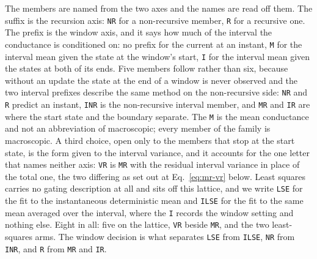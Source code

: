 The members are named from the two axes and the names are read off them. The suffix is the
recursion axis: \texttt{NR} for a non-recursive member, \texttt{R} for a recursive one. The
prefix is the window axis, and it says how much of the interval the conductance is
conditioned on: no prefix for the current at an instant, \texttt{M} for the interval mean
given the state at the window's start, \texttt{I} for the interval mean given the states at
both of its ends. Five members follow rather than six, because without an update the state
at the end of a window is never observed and the two interval prefixes describe the same
method on the non-recursive side: \texttt{NR} and \texttt{R} predict an instant, \texttt{INR}
is the non-recursive interval member, and \texttt{MR} and \texttt{IR} are where the start
state and the boundary separate. The \texttt{M} is the mean conductance and not an
abbreviation of macroscopic; every member of the family is macroscopic. A third choice, open
only to the members that stop at the start state, is the form given to the interval variance,
and it accounts for the one letter that names neither axis: \texttt{VR} is \texttt{MR} with
the residual interval variance in place of the total one, the two differing as set out at
Eq.~\ref{eq:mr-vr} below. Least squares carries no gating description at all and sits off
this lattice, and we write \texttt{LSE} for the fit to the instantaneous deterministic mean
and \texttt{ILSE} for the fit to the same mean averaged over the interval, where the
\texttt{I} records the window setting and nothing else. Eight in all: five on the lattice,
\texttt{VR} beside \texttt{MR}, and the two least-squares arms. The window decision is what
separates \texttt{LSE} from \texttt{ILSE}, \texttt{NR} from \texttt{INR}, and \texttt{R} from
\texttt{MR} and \texttt{IR}.
